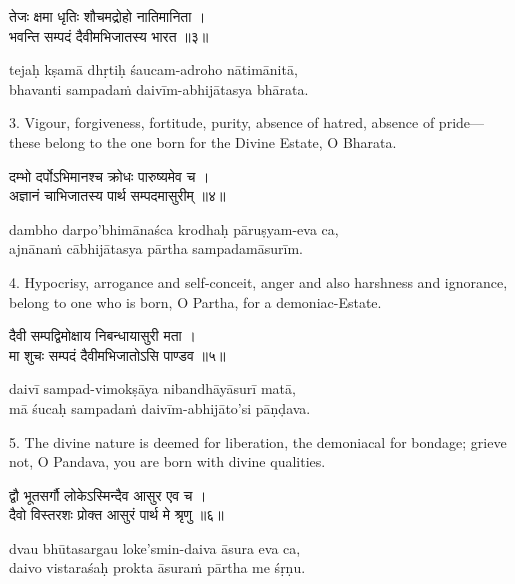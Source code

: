 \begin{gitaverse}
तेजः क्षमा धृतिः शौचमद्रोहो नातिमानिता । \\
भवन्ति सम्पदं दैवीमभिजातस्य भारत ॥३॥
\end{gitaverse}

\begin{transliteration}
tejaḥ kṣamā dhṛtiḥ śaucam-adroho nātimānitā, \\
bhavanti sampadaṁ daivīm-abhijātasya bhārata.
\end{transliteration}

3. Vigour, forgiveness, fortitude, purity, absence of hatred, absence of
pride---these belong to the one born for the Divine Estate, O Bharata.

\begin{gitaverse}
दम्भो दर्पोऽभिमानश्च क्रोधः पारुष्यमेव च । \\
अज्ञानं चाभिजातस्य पार्थ सम्पदमासुरीम् ॥४॥
\end{gitaverse}

\begin{transliteration}
dambho darpo'bhimānaśca krodhaḥ pāruṣyam-eva ca, \\
ajnānaṁ cābhijātasya pārtha sampadamāsurīm.
\end{transliteration}

4. Hypocrisy, arrogance and self-conceit, anger and also harshness and
ignorance, belong to one who is born, O Partha, for a demoniac-Estate.

\begin{gitaverse}
दैवी सम्पद्विमोक्षाय निबन्धायासुरी मता । \\
मा शुचः सम्पदं दैवीमभिजातोऽसि पाण्डव ॥५॥
\end{gitaverse}

\begin{transliteration}
daivī sampad-vimokṣāya nibandhāyāsurī matā, \\
mā śucaḥ sampadaṁ daivīm-abhijāto'si pāṇḍava.
\end{transliteration}

5. The divine nature is deemed for liberation, the demoniacal for bondage;
grieve not, O Pandava, you are born with divine qualities.

\begin{gitaverse}
द्वौ भूतसर्गौ लोकेऽस्मिन्दैव आसुर एव च । \\
दैवो विस्तरशः प्रोक्त आसुरं पार्थ मे श्रृणु ॥६॥
\end{gitaverse}

\begin{transliteration}
dvau bhūtasargau loke'smin-daiva āsura eva ca, \\
daivo vistaraśaḥ prokta āsuraṁ pārtha me śṛṇu.
\end{transliteration}

